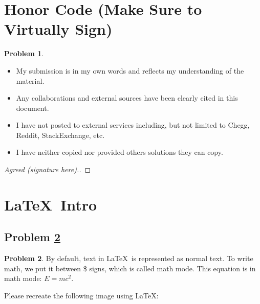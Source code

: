 \documentclass[11pt]{article}
\theoremstyle{definition}
\theoremstyle{definition}
\newtheorem{required}{Problem}
\theoremstyle{definition}
\begin{document}
\section{Honor Code (Make Sure to Virtually Sign)} \label{HonorCode}

\begin{required}
\begin{itemize}
\item My submission is in my own words and reflects my understanding of the material.
\item Any collaborations and external sources have been clearly cited in this document.
\item I have not posted to external services including, but not limited to Chegg, Reddit, StackExchange, etc.
\item I have neither copied nor provided others solutions they can copy.
\end{itemize}

\end{required}

\begin{proof}[Agreed (signature here).]
\end{proof}


\newpage
\section{\LaTeX\ Intro}

\addtocounter{subsection}{1}

\subsection{Problem \ref{Latex1}}
\begin{required} \label{Latex1}
By default, text in \LaTeX\ is represented as normal text. To write math, we put it between \$ signs, which is called math mode.
This equation is in math mode: $E=mc^2$.

Please recreate the following image using \LaTeX:

\end{required}
\end{document}
